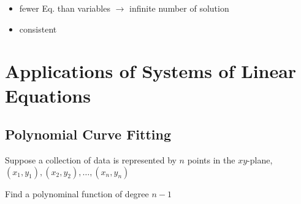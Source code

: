 \documentclass{article}
\newcommand\x{\times}
\begin{document}
    \begin{itemize}
        \item fewer Eq. than variables $\to$ infinite number of solution
        \item consistent
    \end{itemize}



    \iffalse
\begin{equation}\label{eq:appendrow}
  \left[\begin{tblr}{
    colspec = {cccc},
    row{1} = {red9},
    row{3} = {blue9},
    cell{5}{1,3} = {green9},
  }
    \x & \x & \x & \x \\
     0 & \x & \x & \x \\
     0 &  0 & \x & \x \\
     0 &  0 &  0 & \x \\
     a &  b &  c &  d \\
  \end{tblr}\right)
\end{equation}

\begin{equation}
  \left(\begin{tblr}{Q[c,olive9]cQ[c,yellow9]c}
    \x & \x & \x & \x \\
     0 & \x & \x & \x \\
     0 &  0 & \x & \x \\
     0 &  0 &  0 & \x \\
     a &  b &  c &  d \\
  \end{tblr}\right)
\end{equation}
    \fi
    



    \section{Applications of Systems of Linear Equations}

    \subsection{Polynomial Curve Fitting}
    
    Suppose a collection of data is represented by $n$ points in the $xy$-plane,\\
    \quad $(x_1,y_1), (x_2,y_2), \dots, (x_n, y_n)$

    Find a polynominal function of degree $n - 1$
\end{document}
